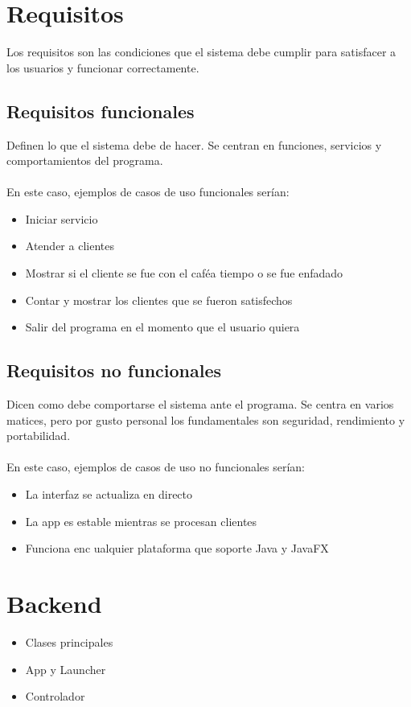 \documentclass[14pt]{extarticle}
\begin{document}
    \newpage    
    \section{Requisitos}
    Los requisitos son las condiciones que el sistema debe cumplir para satisfacer a los usuarios y funcionar correctamente.

    \subsection{Requisitos funcionales}
    Definen lo que el sistema debe de hacer.
    Se centran en funciones, servicios y comportamientos del programa.
    \\\\En este caso, ejemplos de casos de uso funcionales serían:
    \begin{itemize}
        \item Iniciar servicio
        \item Atender a clientes
        \item Mostrar si el cliente se fue con el caféa tiempo o se fue enfadado
        \item Contar y mostrar los clientes que se fueron satisfechos
        \item Salir del programa en el momento que el usuario quiera
    \end{itemize}

    \subsection{Requisitos no funcionales}
    Dicen como debe comportarse el sistema ante el programa. Se centra en varios matices, pero por gusto personal los fundamentales son seguridad, rendimiento y portabilidad.
    \\\\En este caso, ejemplos de casos de uso no funcionales serían:
    \begin{itemize}
        \item La interfaz se actualiza en directo
        \item La app es estable mientras se procesan clientes
        \item Funciona enc ualquier plataforma que soporte Java y JavaFX
    \end{itemize}


    \newpage
    \section{Backend}
        \begin{itemize}
            \item Clases principales
            \item App y Launcher
            \item Controlador
        \end{itemize}
\end{document}
